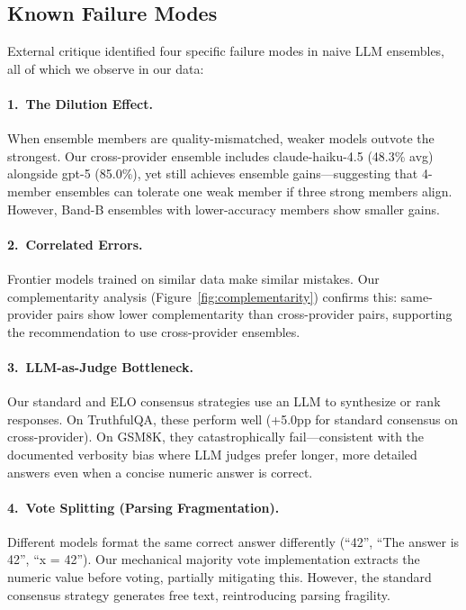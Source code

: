 \documentclass[11pt,a4paper]{article}
\begin{document}
\subsection{Known Failure Modes}

External critique identified four specific failure modes in naive LLM ensembles, all of which we observe in our data:

\paragraph{1.\ The Dilution Effect.}
When ensemble members are quality-mismatched, weaker models outvote the strongest.
Our cross-provider ensemble includes claude-haiku-4.5 (48.3\% avg) alongside gpt-5 (85.0\%), yet still achieves ensemble gains---suggesting that 4-member ensembles can tolerate one weak member if three strong members align.
However, Band-B ensembles with lower-accuracy members show smaller gains.

\paragraph{2.\ Correlated Errors.}
Frontier models trained on similar data make similar mistakes.
Our complementarity analysis (Figure~\ref{fig:complementarity}) confirms this: same-provider pairs show lower complementarity than cross-provider pairs, supporting the recommendation to use cross-provider ensembles.

\paragraph{3.\ LLM-as-Judge Bottleneck.}
Our standard and ELO consensus strategies use an LLM to synthesize or rank responses.
On TruthfulQA, these perform well (+5.0pp for standard consensus on cross-provider).
On GSM8K, they catastrophically fail---consistent with the documented verbosity bias where LLM judges prefer longer, more detailed answers even when a concise numeric answer is correct.

\paragraph{4.\ Vote Splitting (Parsing Fragmentation).}
Different models format the same correct answer differently (``42'', ``The answer is 42'', ``x = 42'').
Our mechanical majority vote implementation extracts the numeric value before voting, partially mitigating this.
However, the standard consensus strategy generates free text, reintroducing parsing fragility.
\end{document}
